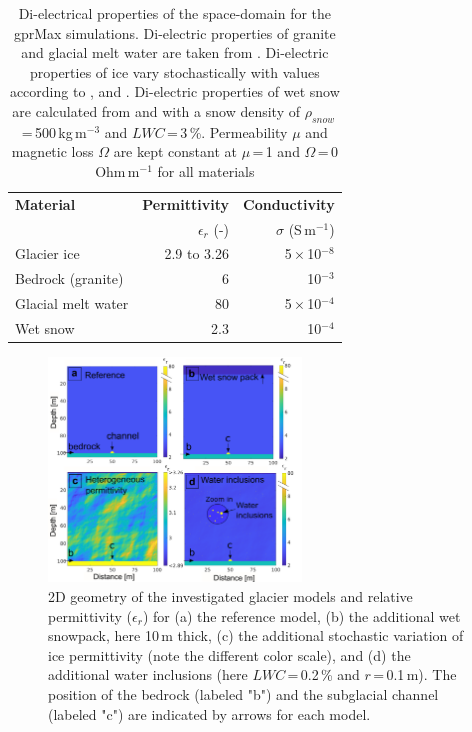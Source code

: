 \begin{table}
\centering
 \caption{Di-electrical properties of the space-domain for the gprMax simulations. Di-electric properties of granite and glacial melt water are taken from \cite{Plewes&Hubbard2001}. Di-electric properties of ice vary stochastically with values according to \cite{Jezek&al1978}, \cite{Johari&Charette1975} and \cite{ Plewes&Hubbard2001}. Di-electric properties of wet snow are calculated from \cite{Tiuri&al1984} and \cite{Granlund&al2010} with a snow density of $\rho_{snow}$\,=\,500\,kg\,m$^{-3}$ and $LWC$\,=\,3\,\%. Permeability $\mu$ and magnetic loss $\Omega$ are kept constant at $\mu$\,=\,1 and $\Omega$\,=\,0 Ohm\,m$^{-1}$ for all materials}
\begin{tabular}{l r r}
\hline
\textbf{Material} & \textbf{Permittivity}  & \textbf{Conductivity}\\
& $\epsilon_r$ (-)& $\sigma$ (S\,m$^{-1}$)\\
\hline
Glacier ice & 2.9 to 3.26 & 5\,$\times$\,10$^{-8}$\\
Bedrock (granite) & 6 & 10$^{-3}$\\
Glacial melt water & 80 & 5\,$\times$\,10$^{-4}$\\
Wet snow & 2.3 & 10$^{-4}$\\
\hline
    \end{tabular}
    \label{tab_material_properties}
\end{table}

\begin{figure}
    \centering
    \includegraphics[width=0.6\textwidth]{chapters/chapter_gprmax/Fig01.pdf}
    \caption{2D geometry of the investigated glacier models and relative permittivity ($\epsilon_r$) for (a) the reference model, (b) the additional wet snowpack, here 10\,m thick, (c) the additional stochastic variation of ice permittivity (note the different color scale), and (d) the additional water inclusions (here $LWC$\,=\,0.2\,\% and $r$\,=\,0.1\,m). The position of the bedrock (labeled "b") and the subglacial channel (labeled "c") are indicated by arrows for each model.}
    \label{fig:model_geometry}
\end{figure}


